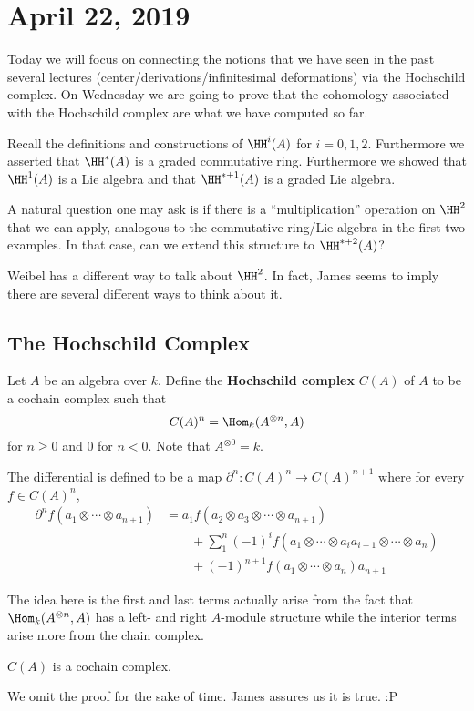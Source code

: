 \documentclass[12pt]{article}
\begin{document}
\section{April 22, 2019}
Today we will focus on connecting the notions that we have seen in the past several lectures (center/derivations/infinitesimal deformations) 
via the Hochschild complex. On Wednesday we are going to prove that the cohomology associated with the Hochschild complex are what we have computed so far.

Recall the definitions and constructions of $\HH^i(A)$ for $i=0,1,2$. Furthermore we asserted that $\HH^*(A)$
is a graded commutative ring. Furthermore we showed that $\HH^1(A)$ is a Lie algebra and that $\HH^{*+1}(A)$ is a 
graded Lie algebra.

A natural question one may ask is if there is a ``multiplication'' operation on $\HH^2$ that we can apply, analogous to the commutative ring/Lie algebra
in the first two examples. In that case, can we extend this structure to $\HH^{*+2}(A)$?
\begin{rmk}
	Weibel has a different way to talk about $\HH^2$. In fact, James seems to imply there are several different ways to think about it.
\end{rmk}

\subsection{The Hochschild Complex}
\begin{defn}
	Let $A$ be an algebra over $k$. Define the \textbf{Hochschild complex} $C(A)$ of $A$ to be a cochain complex 
	such that 
	\[C(A)^n=\Hom_k(A^{\otimes n},A)\]
	for $n\ge 0$ and $0$ for $n<0$. Note that $A^{\otimes 0}=k$.

	The differential is defined to be a map $\partial^n:C(A)^n\to C(A)^{n+1}$ where for every $f\in C(A)^n$,
	\begin{align*}
		\partial^n f(a_1\otimes \cdots\otimes a_{n+1})&=a_1f(a_2\otimes a_3\otimes\cdots\otimes a_{n+1})\\
		&\qquad +\sum_1^n(-1)^if(a_1\otimes\cdots\otimes a_ia_{i+1}\otimes\cdots \otimes a_n)\\
		&\qquad + (-1)^{n+1}f(a_1\otimes\cdots\otimes a_n)a_{n+1}
	\end{align*}
\end{defn}
\begin{rmk}
	The idea here is the first and last terms actually arise from the fact that $\Hom_k(A^{\otimes n},A)$ has a left- and right 
	$A$-module structure while the interior terms arise more from the chain complex.
\end{rmk}
\begin{lem}
	$C(A)$ is a cochain complex.
\end{lem}
\begin{rmk}
	We omit the proof for the sake of time. James assures us it is true. :P
\end{rmk}
\end{document}
